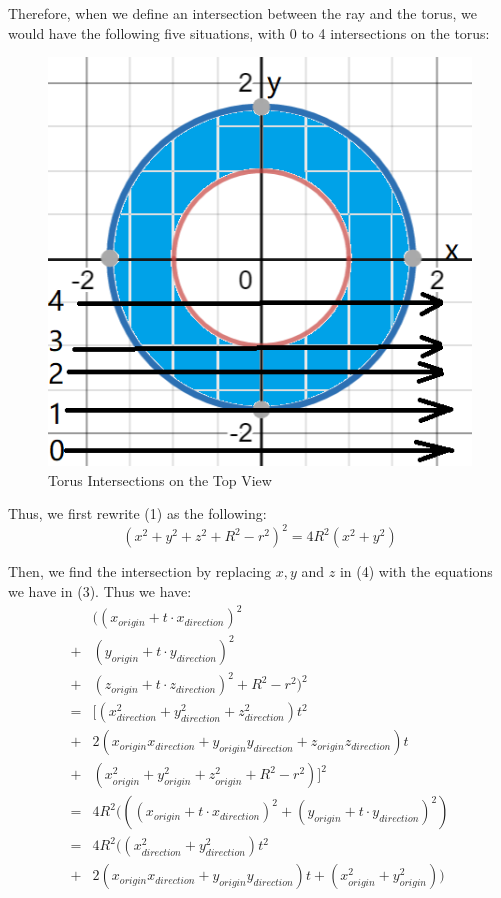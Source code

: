 \documentclass[a4paper,12pt]{report}
\begin{document}
\pagebreak
Therefore, when we define an intersection between the ray and the torus, we would have the following five situations, with 0 to 4 intersections on the torus:
\begin{figure}[h]
\centering
\includegraphics[scale=0.75]{./Pic/Torus4.png}
\caption{Torus Intersections on the Top View}
\end{figure}

Thus, we first rewrite (1) as the following: 
\begin{equation}
(x^2+y^2+z^2+R^2-r^2)^2=4R^2(x^2+y^2)
\end{equation}

Then, we find the intersection by replacing $x,y$ and $z$ in (4) with the equations we have in (3). Thus we have:
\begin{align*}
&((x_{origin}+t\cdot{x_{direction}})^2\\
+&(y_{origin}+t\cdot{y_{direction}})^2\\
+&(z_{origin}+t\cdot{z_{direction}})^2+R^2-r^2)^2\\
=&[(x_{direction}^2+y_{direction}^2+z_{direction}^2)t^2\\
+&2(x_{origin}x_{direction}+y_{origin}y_{direction}+z_{origin}z_{direction})t\\
+&(x_{origin}^2+y_{origin}^2+z_{origin}^2+R^2-r^2)]^2\\
=&4R^2(((x_{origin}+t\cdot{x_{direction}})^2+(y_{origin}+t\cdot{y_{direction}})^2)\\
=&4R^2((x_{direction}^2+y_{direction}^2)t^2\\
+&2(x_{origin}x_{direction}+y_{origin}y_{direction})t+(x_{origin}^2+y_{origin}^2))
\end{align*}
\end{document}
